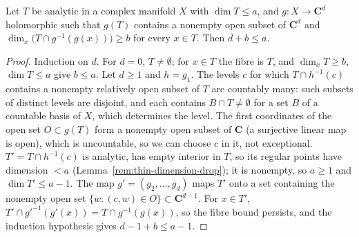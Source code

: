 \begin{lemma}
\label{rem:image-dimension-bound}
\leanok
Let \(T\) be analytic in a complex manifold \(X\) with \(\dim T\le a\), and \(g\colon X\to\mathbf C^d\) holomorphic such that \(g(T)\) contains a nonempty open
subset of \(\mathbf C^d\) and \(\dim_x\bigl(T\cap g^{-1}(g(x))\bigr)\ge b\) for every \(x\in T\). Then \(d+b\le a\).
\end{lemma}
\begin{proof}
\leanok
Induction on \(d\). For \(d=0\), \(T\ne\emptyset\); for \(x\in T\) the fibre is \(T\), and \(\dim_xT\ge b\), \(\dim T\le a\) give \(b\le a\). Let \(d\ge1\) and
\(h=g_1\). The levels \(c\) for which \(T\cap h^{-1}(c)\) contains a nonempty relatively open subset of \(T\) are countably many: such subsets of distinct
levels are disjoint, and each contains \(B\cap T\ne\emptyset\) for a set \(B\) of a countable basis of \(X\), which determines the level. The first coordinates
of the open set \(O\subset g(T)\) form a nonempty open subset of \(\mathbf C\) (a surjective linear map is open), which is uncountable, so we can choose \(c\)
in it, not exceptional. \(T'=T\cap h^{-1}(c)\) is analytic, has empty interior in \(T\), so its regular points have dimension \(<a\)
(Lemma~\ref{rem:thin-dimension-drop}); it is nonempty, so \(a\ge1\) and \(\dim T'\le a-1\). The map \(g'=(g_2,\dots,g_d)\) maps \(T'\) onto a set containing the
nonempty open set \(\{w:(c,w)\in O\}\subset\mathbf C^{d-1}\). For \(x\in T'\), \(T'\cap g'^{-1}(g'(x))=T\cap g^{-1}(g(x))\), so the fibre bound persists, and the
induction hypothesis gives \(d-1+b\le a-1\).
\end{proof}

